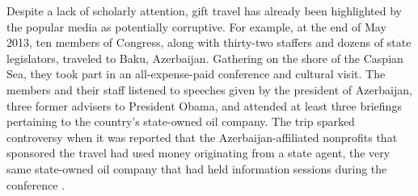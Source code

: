 \documentclass[12pt]{article}                           %
\begin{document}

Despite a lack of scholarly attention, gift travel has already been highlighted by the popular media as potentially corruptive. For example, at the end of May 2013, ten members of Congress, along with thirty-two staffers and dozens of state legislators, traveled to Baku, Azerbaijan. Gathering on the shore of the Caspian Sea, they took part in an all-expense-paid conference and cultural visit. The members and their staff listened to speeches given by the president of Azerbaijan, three former advisers to President Obama, and attended at least three briefings pertaining to the country's state-owned oil company. The trip sparked controversy when it was reported that the Azerbaijan-affiliated nonprofits that sponsored the travel had used money originating from a state agent, the very same state-owned oil company that had held information sessions during the conference \citep{Tucker2014}.
\end{document}
